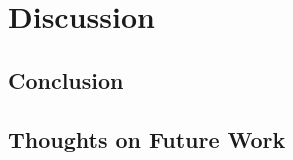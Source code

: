 \section{Discussion}


\subsection{Conclusion}
\lipsum[11-13]

\subsection{Thoughts on Future Work}
